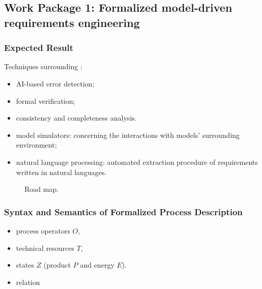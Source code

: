 \subsection{Work Package 1: Formalized model-driven requirements engineering}

\subsubsection{Expected Result}

Techniques surrounding :
\vspace{-.5cm}
\begin{itemize}
  \item AI-based error detection;
  \item formal verification;
  \item consistency and completeness analysis.
  \item model simulators: concerning the interactions with models' 
    surrounding environment;
  \item natural language processing: automated extraction procedure 
    of requirements written in natural languages.
\end{itemize}

\newcommand{\clanodetxt}[1]{\textbf{\footnotesize{#1}}}
\begin{figure}[H]
\centering  
{}
\caption{Road map.}
\end{figure}

\subsubsection{Syntax and Semantics of Formalized Process Description}

\begin{itemize}
  \item process operators $O$,
  \item technical resources $T$,
  \item states $Z$ (product $P$ and energy $E$).
  \item relation 
\end{itemize}

